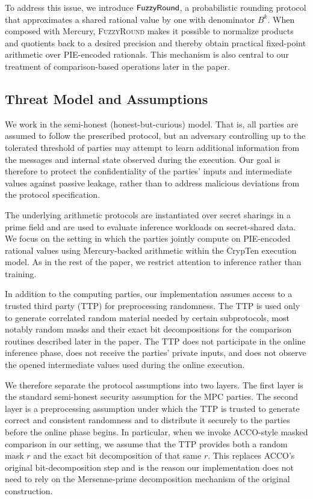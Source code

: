 To address this issue, we introduce $\mathsf{FuzzyRound}$, a probabilistic rounding protocol that approximates a shared rational value by one with denominator $B^k$. When composed with Mercury, \textsc{FuzzyRound} makes it possible to normalize products and quotients back to a desired precision and thereby obtain practical fixed-point arithmetic over PIE-encoded rationals. This mechanism is also central to our treatment of comparison-based operations later in the paper.

\subsection{Threat Model and Assumptions}
\label{sec:background-threat-model}

We work in the semi-honest (honest-but-curious) model. That is, all parties are assumed to follow the prescribed protocol, but an adversary controlling up to the tolerated threshold of parties may attempt to learn additional information from the messages and internal state observed during the execution. Our goal is therefore to protect the confidentiality of the parties' inputs and intermediate values against passive leakage, rather than to address malicious deviations from the protocol specification. %

The underlying arithmetic protocols are instantiated over secret sharings in a prime field and are used to evaluate inference workloads on secret-shared data. We focus on the setting in which the parties jointly compute on PIE-encoded rational values using Mercury-backed arithmetic within the CrypTen execution model. As in the rest of the paper, we restrict attention to inference rather than training. %

In addition to the computing parties, our implementation assumes access to a trusted third party (TTP) for preprocessing randomness. The TTP is used only to generate correlated random material needed by certain subprotocols, most notably random masks and their exact bit decompositions for the comparison routines described later in the paper. The TTP does not participate in the online inference phase, does not receive the parties' private inputs, and does not observe the opened intermediate values used during the online execution.

We therefore separate the protocol assumptions into two layers. The first layer is the standard 
semi-honest security assumption for the MPC parties. The second layer is a preprocessing 
assumption under which the TTP is trusted to generate correct and consistent randomness and 
to distribute it securely to the parties before the online phase begins. In particular, when 
we invoke ACCO-style masked comparison in our setting, we assume that the TTP provides both a random mask $r$ and the 
exact bit decomposition of that same $r$. This replaces ACCO's original
bit-decomposition step and is the reason our implementation does not
need to rely on the Mersenne-prime decomposition mechanism of the
original construction. %

